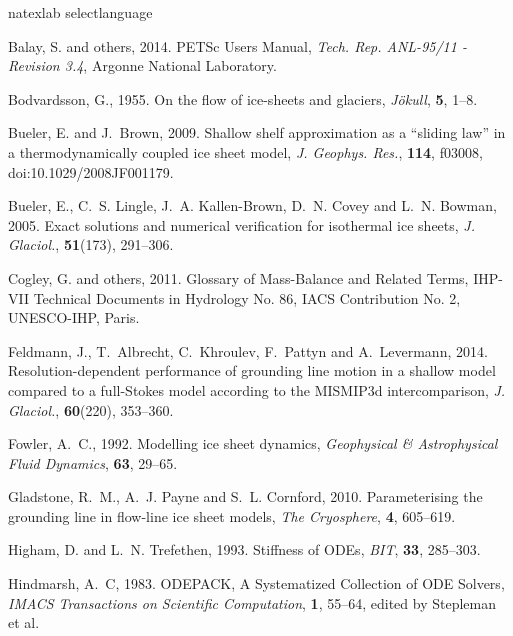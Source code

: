 \documentclass[twocolumn,letterpaper]{igs}
\begin{document}
\begin{thebibliography}{29}
\expandafter\ifx\csname natexlab\endcsname\relax\def\natexlab#1{#1}\fi
\expandafter\ifx\csname selectlanguage\endcsname\relax
  \def\selectlanguage#1{\relax}\fi

Balay, S. and others, 2014. {PETS}c {U}sers {M}anual, {\em Tech. Rep. ANL-95/11
  - Revision 3.4\/}, Argonne National Laboratory.

Bodvardsson, G., 1955. On the flow of ice-sheets and glaciers, {\em
  J{\"o}kull\/}, {\bf 5}, 1--8.

Bueler, E. and J.~Brown, 2009. Shallow shelf approximation as a ``sliding law''
  in a thermodynamically coupled ice sheet model, {\em J. Geophys. Res.\/},
  {\bf 114}, f03008, doi:10.1029/2008JF001179.

Bueler, E., C.~S. Lingle, J.~A. Kallen-Brown, D.~N. Covey and L.~N. Bowman,
  2005. Exact solutions and numerical verification for isothermal ice sheets,
  {\em J. Glaciol.\/}, {\bf 51}(173), 291--306.

Cogley, G. and others, 2011. Glossary of {M}ass-{B}alance and {R}elated
  {T}erms, {IHP-VII Technical Documents in Hydrology No. 86, IACS
  Contribution No. 2, UNESCO-IHP, Paris}.

Feldmann, J., T.~Albrecht, C.~Khroulev, F.~Pattyn and A.~Levermann, 2014.
  Resolution-dependent performance of grounding line motion in a shallow model
  compared to a full-{S}tokes model according to the {MISMIP3d}
  intercomparison, {\em J. Glaciol.\/}, {\bf 60}(220), 353--360.

Fowler, A.~C., 1992. Modelling ice sheet dynamics, {\em Geophysical \&
  Astrophysical Fluid Dynamics\/}, {\bf 63}, 29--65.

Gladstone, R.~M., A.~J. Payne and S.~L. Cornford, 2010. Parameterising the
  grounding line in flow-line ice sheet models, {\em The Cryosphere\/}, {\bf
  4}, 605--619.

Higham, D. and L.~N. Trefethen, 1993. Stiffness of {ODE}s, {\em BIT\/}, {\bf
  33}, 285--303.

Hindmarsh, A.~C, 1983. {ODEPACK, A Systematized Collection of ODE Solvers},
  {\em IMACS Transactions on Scientific Computation\/}, {\bf 1}, 55--64, edited
  by Stepleman et al.


\end{thebibliography}
\end{document}

